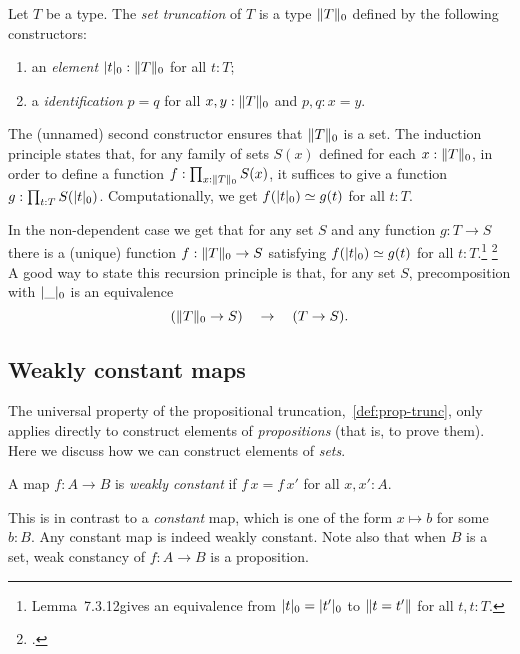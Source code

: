 \begin{definition}\label{def:set-truncation}
Let $T$ be a type. The \emph{set truncation} of $T$
is a type  $\lVert T\rVert_0$ defined by the following constructors:
\begin{enumerate}
\item an \emph{element} $\lvert t\rvert_0 : \lVert T\rVert_0$ for all $t:T$;
\item a \emph{identification} $p=q$ for all $x,y:\lVert T\rVert_0$ and $p,q: x=y$.
\end{enumerate}
The (unnamed) second constructor ensures that $\lVert T\rVert_0$ is a
set. The induction principle states that,
for any family of sets $S(x)$ defined for each $x:\lVert T\rVert_0$, 
in order to define a function $f:\prod_{x:\lVert T\rVert_0} S(x)$,
it suffices to give a function $g: \prod_{t:T} S(\lvert t\rvert_0)$.
Computationally, we get $f(\trunc{t}_0)\jdeq g(t)$ for all $t:T$. 
\end{definition}

In the non-dependent case we get that for any set $S$ and
any function $g: T\to S$ there is a (unique) function $f:\lVert T\rVert_0\to S$ 
satisfying $f(\trunc{t}_0)\jdeq g(t)$ for all $t:T$.\footnote{%
Lemma~7.3.12\footnotemark gives an equivalence from 
$\lvert t\rvert_0 = \lvert t'\rvert_0$ to $\lVert t=t'\rVert$ for all $t,t:T$.}%
\footcitetext{hottbook}
A good way to state this recursion principle is that, 
for any set $S$, precomposition with $\lvert\_\rvert_0$ is an equivalence
\[
(\lVert T\rVert_0 \to S) \quad \to \quad (T \to S).
\]

\subsection{Weakly constant maps}

The universal property of the propositional truncation,~\cref{def:prop-trunc},
only applies directly to construct elements of \emph{propositions} (that is, to prove them).
Here we discuss how we can construct elements of \emph{sets}.

\begin{definition}
  A map $f: A \to B$ is \emph{weakly constant} if $f\,x = f\,x'$ for all $x,x':A$.
\end{definition}
This is in contrast to a \emph{constant} map,
which is one of the form $x \mapsto b$ for some $b:B$.
Any constant map is indeed weakly constant.
Note also that when $B$ is a set,
weak constancy of $f : A \to B$ is a proposition.

